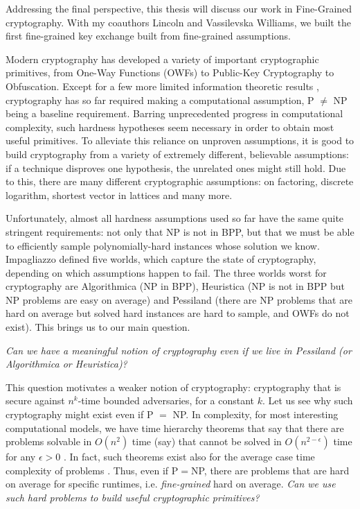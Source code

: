 Addressing the final perspective, this thesis will discuss our work in Fine-Grained cryptography. With my coauthors Lincoln and Vassilevska Williams, we built the first fine-grained key exchange built from fine-grained assumptions.

Modern cryptography has developed a variety of important cryptographic primitives, from One-Way Functions (OWFs) to Public-Key Cryptography to Obfuscation. 
Except for a few more limited information theoretic results \cite{Shamir79,CKGS98,RW02}, cryptography has so far required making a computational assumption, P $\neq$ NP being a baseline requirement.
Barring unprecedented progress in computational complexity, such hardness hypotheses seem necessary in order to obtain most useful primitives. 
To alleviate this reliance on unproven assumptions, it is good to build cryptography from a variety of extremely different, believable assumptions: if a technique disproves one hypothesis, the unrelated ones might still hold. Due to this, there are many different cryptographic assumptions: on factoring, discrete logarithm, shortest vector in lattices and many more.




Unfortunately, almost all hardness assumptions used so far have the same quite stringent requirements: not only that NP is not in BPP, but that we must be able to efficiently sample polynomially-hard instances whose solution we know. Impagliazzo \cite{Impagliazzo5worlds,RR94} defined five worlds, which capture the state of cryptography, depending on which assumptions happen to fail. The three worlds worst for cryptography are Algorithmica (NP in BPP), Heuristica (NP is not in BPP but NP problems are easy on average) and Pessiland (there are NP problems that are hard on average but solved hard instances are hard to sample, and OWFs do not exist). 
This brings us to our main question.

\begin{center}
 \emph{	Can we have a meaningful notion of cryptography even if we live in Pessiland (or Algorithmica or Heuristica)?}
\end{center}

This question motivates a weaker notion of cryptography: cryptography that is secure against $n^k$-time bounded adversaries, for a constant $k$. Let us see why such cryptography might exist even if P $=$ NP. In complexity, for most interesting computational models, we have time hierarchy theorems that say that there are problems solvable in $O(n^2)$ time (say) that cannot be solved in $O(n^{2-\epsilon})$ time for any $\epsilon>0$ \cite{HS65,HS66,Tse56}. In fact, such theorems exist also for the average case time complexity of problems \cite{Lev73}. Thus, even if P$=$NP, there are problems that are hard on average for specific runtimes, i.e. {\em fine-grained} hard on average. {\em Can we use such hard problems to build useful cryptographic primitives?} 

